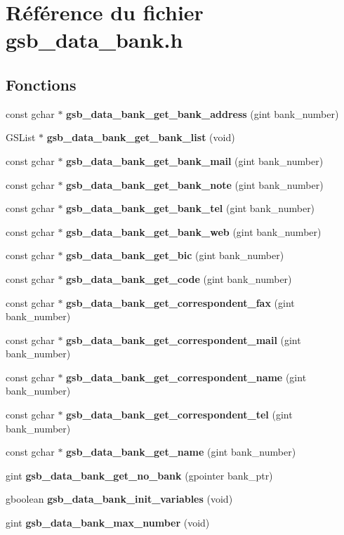 \section{Référence du fichier gsb\_\-data\_\-bank.h}
\label{gsb__data__bank_8h}
\subsection*{Fonctions}
\begin{DoxyCompactItemize}
\item 
const gchar $\ast$ {\bf gsb\_\-data\_\-bank\_\-get\_\-bank\_\-address} (gint bank\_\-number)
\item 
GSList $\ast$ {\bf gsb\_\-data\_\-bank\_\-get\_\-bank\_\-list} (void)
\item 
const gchar $\ast$ {\bf gsb\_\-data\_\-bank\_\-get\_\-bank\_\-mail} (gint bank\_\-number)
\item 
const gchar $\ast$ {\bf gsb\_\-data\_\-bank\_\-get\_\-bank\_\-note} (gint bank\_\-number)
\item 
const gchar $\ast$ {\bf gsb\_\-data\_\-bank\_\-get\_\-bank\_\-tel} (gint bank\_\-number)
\item 
const gchar $\ast$ {\bf gsb\_\-data\_\-bank\_\-get\_\-bank\_\-web} (gint bank\_\-number)
\item 
const gchar $\ast$ {\bf gsb\_\-data\_\-bank\_\-get\_\-bic} (gint bank\_\-number)
\item 
const gchar $\ast$ {\bf gsb\_\-data\_\-bank\_\-get\_\-code} (gint bank\_\-number)
\item 
const gchar $\ast$ {\bf gsb\_\-data\_\-bank\_\-get\_\-correspondent\_\-fax} (gint bank\_\-number)
\item 
const gchar $\ast$ {\bf gsb\_\-data\_\-bank\_\-get\_\-correspondent\_\-mail} (gint bank\_\-number)
\item 
const gchar $\ast$ {\bf gsb\_\-data\_\-bank\_\-get\_\-correspondent\_\-name} (gint bank\_\-number)
\item 
const gchar $\ast$ {\bf gsb\_\-data\_\-bank\_\-get\_\-correspondent\_\-tel} (gint bank\_\-number)
\item 
const gchar $\ast$ {\bf gsb\_\-data\_\-bank\_\-get\_\-name} (gint bank\_\-number)
\item 
gint {\bf gsb\_\-data\_\-bank\_\-get\_\-no\_\-bank} (gpointer bank\_\-ptr)
\item 
gboolean {\bf gsb\_\-data\_\-bank\_\-init\_\-variables} (void)
\item 
gint {\bf gsb\_\-data\_\-bank\_\-max\_\-number} (void)

\end{DoxyCompactItemize}
